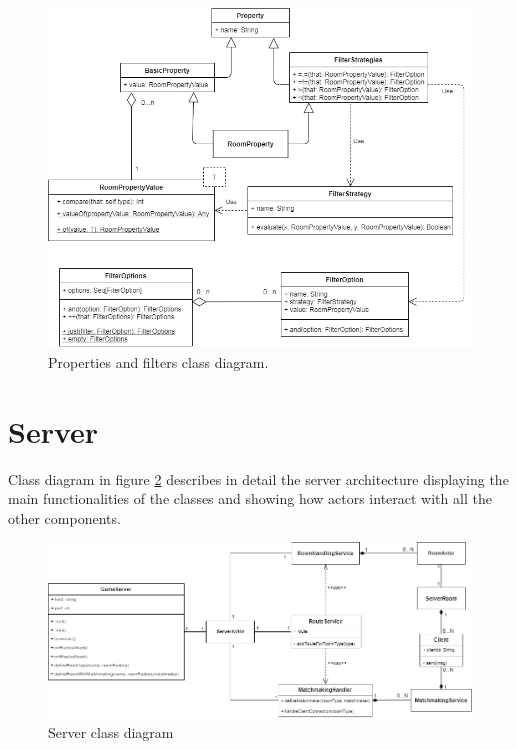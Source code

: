 \begin{figure}[h]
	\hspace*{-0.1in}
	\includegraphics[scale=0.55]{images/4-design/property_and_filters-class.png}
	\caption{Properties and filters class diagram.}
	\label{fig:property-class}
\end{figure}


\section{Server}
Class diagram in figure \ref{fig:server_class_diagram} describes in detail the server architecture displaying the main functionalities of the classes and showing how actors interact with all the other components. 
\begin{figure}[h]
	\hspace*{-1.1in}
	\includegraphics[scale=0.55]{images/4-design/server_class.png}
	\caption{Server class diagram}
	\label{fig:server_class_diagram}
\end{figure}

